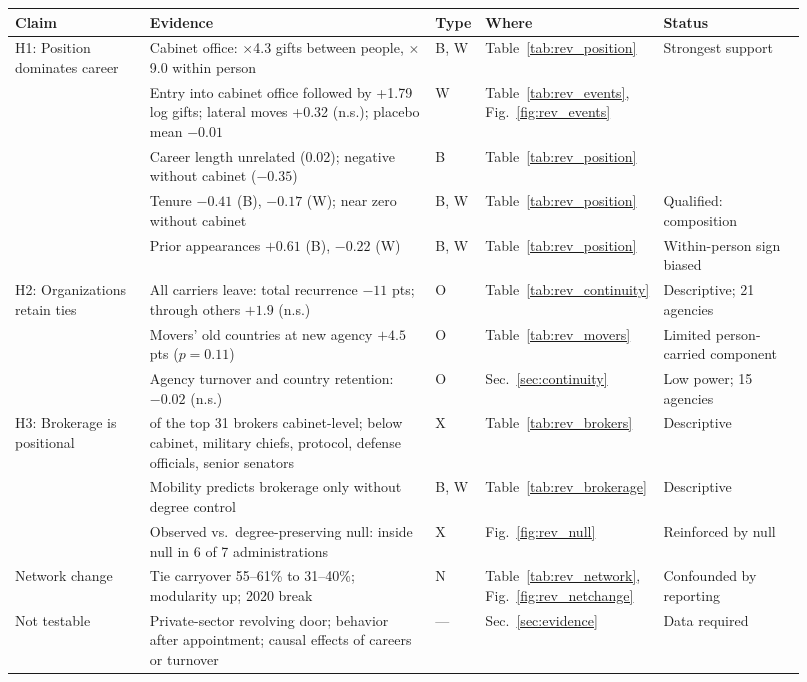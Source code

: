 \documentclass[11pt]{article}
\begin{document}
\begin{center}
\scriptsize\setlength{\tabcolsep}{3pt}
\label{tab:rev_map}
\begin{tabular}{>{\raggedright\arraybackslash}p{0.17\linewidth}>{\raggedright\arraybackslash}p{0.36\linewidth}>{\raggedright\arraybackslash}p{0.06\linewidth}>{\raggedright\arraybackslash}p{0.15\linewidth}>{\raggedright\arraybackslash}p{0.18\linewidth}}
\toprule
Claim & Evidence & Type & Where & Status \\
\midrule
H1: Position dominates career & Cabinet office: $\times$4.3 gifts between people, $\times$9.0 within person & B, W & Table~\ref{tab:rev_position} & Strongest support \\
 & Entry into cabinet office followed by +1.79 log gifts; lateral moves +0.32 (n.s.); placebo mean $-0.01$ & W & Table~\ref{tab:rev_events}, Fig.~\ref{fig:rev_events} & \\
 & Career length unrelated (0.02); negative without cabinet ($-0.35$) & B & Table~\ref{tab:rev_position} & \\
 & Tenure $-0.41$ (B), $-0.17$ (W); near zero without cabinet & B, W & Table~\ref{tab:rev_position} & Qualified: composition \\
 & Prior appearances $+0.61$ (B), $-0.22$ (W) & B, W & Table~\ref{tab:rev_position} & Within-person sign biased \\
H2: Organizations retain ties & All carriers leave: total recurrence $-11$ pts; through others $+1.9$ (n.s.) & O & Table~\ref{tab:rev_continuity} & Descriptive; 21 agencies \\
 & Movers' old countries at new agency $+4.5$ pts ($p=0.11$) & O & Table~\ref{tab:rev_movers} & Limited person-carried component \\
 & Agency turnover and country retention: $-0.02$ (n.s.) & O & Sec.~\ref{sec:continuity} & Low power; 15 agencies \\
H3: Brokerage is positional & 29 of the top 31 brokers cabinet-level; below cabinet, military chiefs, protocol, defense officials, senior senators & X & Table~\ref{tab:rev_brokers} & Descriptive \\
 & Mobility predicts brokerage only without degree control & B, W & Table~\ref{tab:rev_brokerage} & Descriptive \\
 & Observed vs.\ degree-preserving null: inside null in 6 of 7 administrations & X & Fig.~\ref{fig:rev_null} & Reinforced by null \\
Network change & Tie carryover 55--61\% to 31--40\%; modularity up; 2020 break & N & Table~\ref{tab:rev_network}, Fig.~\ref{fig:rev_netchange} & Confounded by reporting \\
Not testable & Private-sector revolving door; behavior after appointment; causal effects of careers or turnover & --- & Sec.~\ref{sec:evidence} & Data required \\
\bottomrule
\end{tabular}
\end{center}
\end{document}
